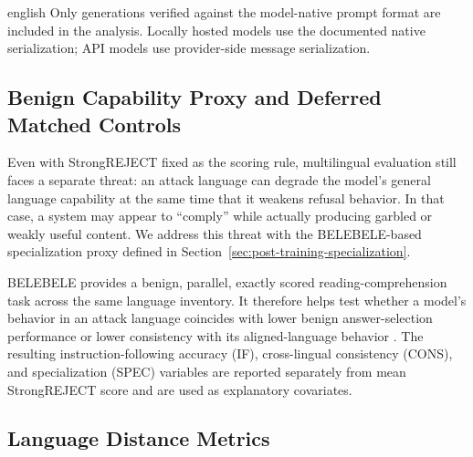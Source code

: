 \begin{otherlanguage*}{english}
Only generations verified against the model-native prompt format are included in the analysis. Locally hosted models use the documented native serialization; API models use provider-side message serialization.

\subsection{Benign Capability Proxy and Deferred Matched Controls}
\label{sec:capability-control}

Even with StrongREJECT fixed as the scoring rule, multilingual evaluation still faces a separate threat: an attack language can degrade the model's general language capability at the same time that it weakens refusal behavior. In that case, a system may appear to ``comply'' while actually producing garbled or weakly useful content. We address this threat with the BELEBELE-based specialization proxy defined in Section~\ref{sec:post-training-specialization}.

BELEBELE provides a benign, parallel, exactly scored reading-comprehension task across the same language inventory. It therefore helps test whether a model's behavior in an attack language coincides with lower benign answer-selection performance or lower consistency with its aligned-language behavior \cite{bandarkar-etal-2024-belebele}. The resulting instruction-following accuracy (IF), cross-lingual consistency (CONS), and specialization (SPEC) variables are reported separately from mean StrongREJECT score and are used as explanatory covariates.

\subsection{Language Distance Metrics}


\end{otherlanguage*}
